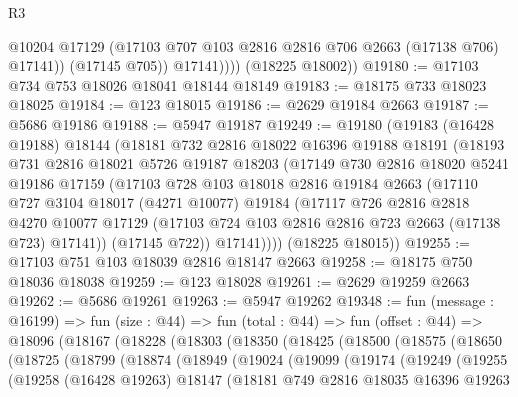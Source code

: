 \begin{lexlean}{R3}
\begin{coremodule}
                  @10204
                  @17129
                  (@17103 @707 @103 @2816 @2816 @706 @2663 (@17138 @706) @17141))
                (@17145 @705))
              @17141))))
      (@18225 @18002))
@19180 := @17103 @734 @753 @18026 @18041 @18144 @18149
@19183 := @18175 @733 @18023 @18025
@19184 := @123 @18015
@19186 := @2629 @19184 @2663
@19187 := @5686 @19186
@19188 := @5947 @19187
@19249 := @19180
    (@19183
      (@16428 @19188)
      @18144
      (@18181
        @732
        @2816
        @18022
        @16396
        @19188
        @18191
        (@18193
          @731
          @2816
          @18021
          @5726
          @19187
          @18203
          (@17149
            @730
            @2816
            @18020
            @5241
            @19186
            @17159
            (@17103
              @728
              @103
              @18018
              @2816
              @19184
              @2663
              (@17110
                @727
                @3104
                @18017
                (@4271 @10077)
                @19184
                (@17117
                  @726
                  @2816
                  @2818
                  @4270
                  @10077
                  @17129
                  (@17103 @724 @103 @2816 @2816 @723 @2663 (@17138 @723) @17141))
                (@17145 @722))
              @17141))))
      (@18225 @18015))
@19255 := @17103 @751 @103 @18039 @2816 @18147 @2663
@19258 := @18175 @750 @18036 @18038
@19259 := @123 @18028
@19261 := @2629 @19259 @2663
@19262 := @5686 @19261
@19263 := @5947 @19262
@19348 := fun (message : @16199) =>
  fun (size : @44) =>
  fun (total : @44) =>
  fun (offset : @44) =>
  @18096
    (@18167
      (@18228
        (@18303
          (@18350
            (@18425
              (@18500
                (@18575
                  (@18650
                    (@18725
                      (@18799
                        (@18874
                          (@18949
                            (@19024
                              (@19099
                                (@19174
                                  (@19249
                                    (@19255
                                      (@19258
                                        (@16428 @19263)
                                        @18147
                                        (@18181
                                          @749
                                          @2816
                                          @18035
                                          @16396
                                          @19263

\end{coremodule}
\end{lexlean}
